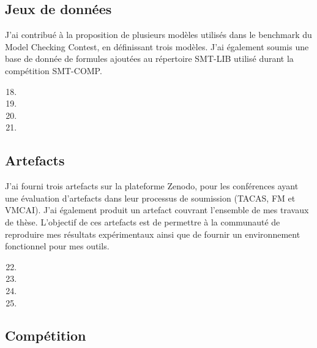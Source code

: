 \vspace{10pt}
\subsection*{Jeux de données}
\vspace{10pt}
J'ai contribué à la proposition de plusieurs modèles utilisés dans le benchmark du Model Checking Contest, en 
définissant trois modèles. J'ai également soumis une base de donnée de formules ajoutées au répertoire SMT-LIB
utilisé durant la compétition SMT-COMP.
\vspace{10pt}
\begin{enumerate}
  \setcounter{enumi}{17}
  \item {}\smallbreak
  \item {}\smallbreak
  \item {}\smallbreak
  \item {}
\end{enumerate}

\vspace{10pt}
\subsection*{Artefacts}
\vspace{10pt}

J'ai fourni trois artefacts sur la plateforme \textsf{Zenodo}, pour les
conférences ayant une évaluation d'artefacts dans leur processus de soumission
(TACAS, FM et VMCAI). J'ai également produit un artefact couvrant l'ensemble de
mes travaux de thèse. L'objectif de ces artefacts est de permettre à la
communauté de reproduire mes résultats expérimentaux ainsi que de fournir un
environnement fonctionnel pour mes outils.
\vspace{10pt}
\begin{enumerate}
  \setcounter{enumi}{21}
  \item {}\smallbreak
  \item {}\smallbreak
  \item {}\smallbreak
  \item {}
\end{enumerate}

\vspace{10pt}
\subsection*{Compétition}
\vspace{10pt}

